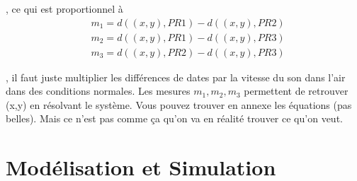 \documentclass[a4paper, 8pt]{article}
\begin{document}
, ce qui est proportionnel à
\begin{equation}\label{2}
		\begin{split}
		& m_{1} = d((x,y),PR1)-d((x,y),PR2)\\
		& m_{2} = d((x,y),PR1)-d((x,y),PR3)\\
		& m_{3} = d((x,y),PR2)-d((x,y),PR3)
		\end{split}
\end{equation}

, il faut juste multiplier les différences de dates par la vitesse du son dans l'air dans des conditions normales. Les mesures $m_{1}, m_{2},  m_{3}$ permettent de retrouver (x,y) en résolvant le système. Vous pouvez trouver en annexe les équations (pas belles). Mais ce n'est pas comme ça qu'on va en réalité trouver ce qu'on veut.


\section{Modélisation et Simulation}
\end{document}
